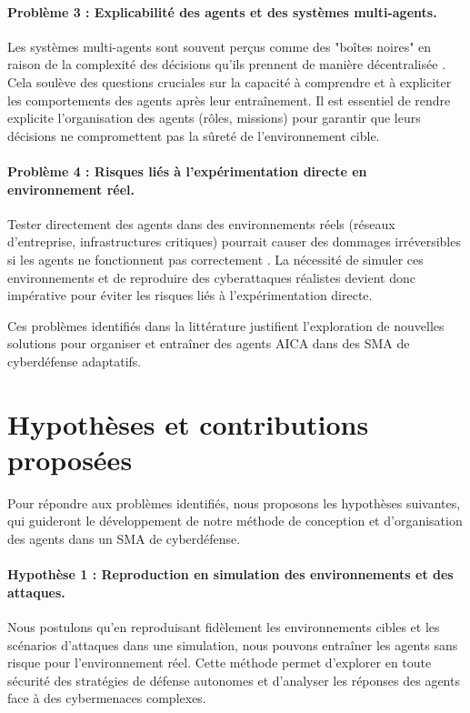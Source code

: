 \paragraph{Problème 3 : Explicabilité des agents et des systèmes multi-agents.}
Les systèmes multi-agents sont souvent perçus comme des "boîtes noires" en raison de la complexité des décisions qu’ils prennent de manière décentralisée \cite{Theron2018}. Cela soulève des questions cruciales sur la capacité à comprendre et à expliciter les comportements des agents après leur entraînement. Il est essentiel de rendre explicite l'organisation des agents (rôles, missions) pour garantir que leurs décisions ne compromettent pas la sûreté de l'environnement cible.

\paragraph{Problème 4 : Risques liés à l'expérimentation directe en environnement réel.}
Tester directement des agents dans des environnements réels (réseaux d'entreprise, infrastructures critiques) pourrait causer des dommages irréversibles si les agents ne fonctionnent pas correctement \cite{Calo2017}. La nécessité de simuler ces environnements et de reproduire des cyberattaques réalistes devient donc impérative pour éviter les risques liés à l’expérimentation directe.

Ces problèmes identifiés dans la littérature justifient l'exploration de nouvelles solutions pour organiser et entraîner des agents AICA dans des SMA de cyberdéfense adaptatifs.


\section{Hypothèses et contributions proposées}

Pour répondre aux problèmes identifiés, nous proposons les hypothèses suivantes, qui guideront le développement de notre méthode de conception et d'organisation des agents dans un SMA de cyberdéfense.

\paragraph{Hypothèse 1 : Reproduction en simulation des environnements et des attaques.}
Nous postulons qu'en reproduisant fidèlement les environnements cibles et les scénarios d'attaques dans une simulation, nous pouvons entraîner les agents sans risque pour l’environnement réel. Cette méthode permet d'explorer en toute sécurité des stratégies de défense autonomes et d'analyser les réponses des agents face à des cybermenaces complexes.

